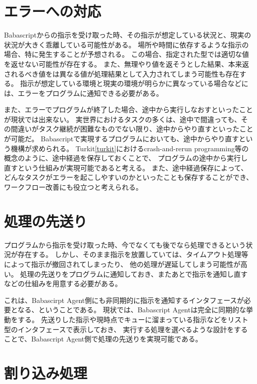 \section{エラーへの対応}\label{ux30a8ux30e9ux30fcux3078ux306eux5bfeux5fdc}

Babascriptからの指示を受け取った時、その指示が想定している状況と、現実の状況が大きく乖離している可能性がある。
場所や時間に依存するような指示の場合、特に発生することが予想される。
この場合、指定された型では適切な値を返せない可能性が存在する。
また、無理やり値を返そうとした結果、本来返されるべき値をは異なる値が処理結果として入力されてしまう可能性も存在する。
指示が想定している環境と現実の環境が明らかに異なっている場合などには、エラーをプログラムに通知できる必要がある。

また、エラーでプログラムが終了した場合、途中から実行しなおすといったことが現状では出来ない。
実世界におけるタスクの多くは、途中で間違っても、その間違いがタスク継続が困難なものでない限り、途中からやり直すといったことが可能だ。
Babascriptで実現するプログラムにおいても、途中からやり直すという機構が求められる。
Turkit\ref{turkit}におけるcrash-and-rerun
programming等の概念のように、途中経過を保存しておくことで、
プログラムの途中から実行し直すという仕組みが実現可能であると考える。
また、途中経過保存によって、どんなタスクがエラーを起こしやすいのかといったことも保存することができ、
ワークフロー改善にも役立つと考えられる。

\section{処理の先送り}\label{ux51e6ux7406ux306eux5148ux9001ux308a}

プログラムから指示を受け取った時、今でなくても後でなら処理できるという状況が存在する。
しかし、そのまま指示を放置していては、タイムアウト処理等によって指示が撤回されてしまったり、
他の処理が遅延してしまう可能性が高い。
処理の先送りをプログラムに通知しておき、またあとで指示を通知し直すなどの仕組みを用意する必要がある。

これは、Babascirpt
Agent側にも非同期的に指示を通知するインタフェースが必要となる、ということである。
現状では、Babascript Agentは完全に同期的な挙動をする。
先送りした指示や現時点でキューに溜まっている指示などをリスト型のインタフェースで表示しておき、
実行する処理を選べるような設計をすることで、Babascript
Agent側で処理の先送りを実現可能である。

\section{割り込み処理}\label{ux5272ux308aux8fbcux307fux51e6ux7406}

